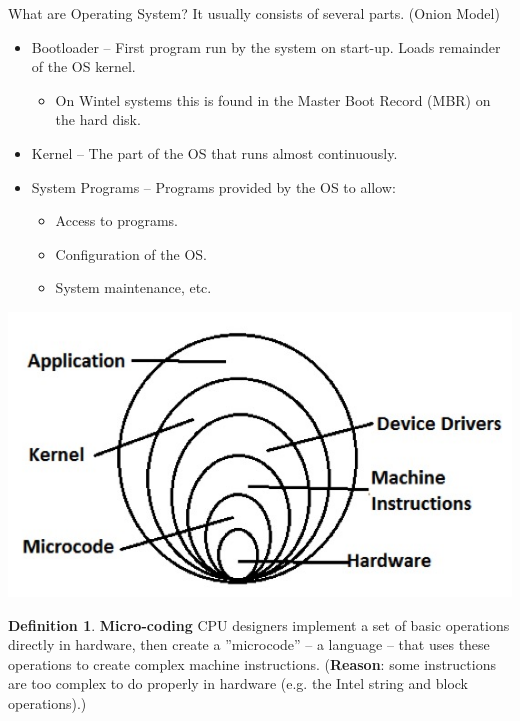 \documentclass[12pt,a4paper]{article}
\theoremstyle{definition}
\newtheorem{definition}{Definition}[section]
\newenvironment{myitemize}
{ \begin{itemize}
    \setlength{\itemsep}{5pt}
    \setlength{\parskip}{0pt}
    \setlength{\parsep}{0pt}     }
{ \end{itemize}                  }
\begin{document}
\begin{tcolorbox}
	\textsf{What are Operating System?} It usually consists of several parts. (\textsf{Onion Model})
	
	\begin{myitemize}
		\item Bootloader – First program run by the system on start-up. Loads remainder of the OS kernel. 
		\begin{myitemize}
			\item On Wintel systems this is found in the Master Boot Record (MBR) on the hard disk.
		\end{myitemize}
		\item Kernel – The part of the OS that runs almost continuously. 
		\item System Programs – Programs provided by the OS to allow:
		\begin{myitemize}
		\item Access to programs.
		\item Configuration of the OS.
		\item System maintenance, etc.
		\end{myitemize}
	\end{myitemize}
		\includegraphics[scale=0.5]{m1/onionModel}
		\centering
\end{tcolorbox}

\begin{definition}{\textbf{Micro-coding}}
	CPU designers implement a set of basic operations directly in hardware, then create a ''microcode'' – a language – that uses these operations to create complex machine instructions. (\textbf{Reason}: some instructions are too complex to do properly in hardware (e.g. the Intel string and block operations).)
\end{definition}
\end{document}

